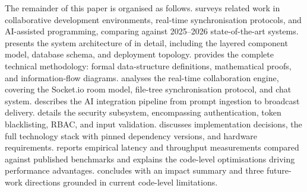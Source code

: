 The remainder of this paper is organised as follows.
 surveys related work in collaborative development
environments, real-time synchronisation protocols, and AI-assisted
programming, comparing \echoray{} against 2025--2026 state-of-the-art systems.
 presents the system architecture of \echoray{} in
detail, including the layered component model, database schema, and deployment
topology.
 provides the complete technical methodology: formal
data-structure definitions, mathematical proofs, and information-flow diagrams.
 analyses the real-time collaboration engine, covering the
Socket.io room model, file-tree synchronisation protocol, and chat system.
 describes the AI integration pipeline from prompt ingestion to
broadcast delivery.
 details the security subsystem, encompassing
authentication, token blacklisting, RBAC, and input validation.
 discusses implementation decisions, the full
technology stack with pinned dependency versions, and hardware requirements.
 reports empirical latency and throughput measurements
compared against published benchmarks and explains the code-level optimisations
driving performance advantages.
 concludes with an impact summary and three future-work
directions grounded in current code-level limitations.
